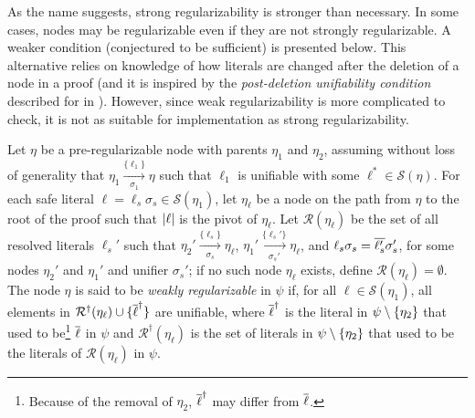 As the name suggests, strong regularizability is stronger than necessary. In some cases, nodes may be regularizable even if they are not strongly regularizable. A weaker condition (conjectured to be sufficient) is presented below. This alternative relies on knowledge of how literals are changed after the deletion of a node in a proof (and it is inspired by the \emph{post-deletion unifiability condition} described for {\FOLowerUnits} in \cite{GFOLU}). However, since weak regularizability is more complicated to check, it is not as suitable for implementation as strong regularizability. 
\begin{definition}\label{def:postdelprop}
Let $\eta$ be a pre-regularizable node with parents $\eta_1$ and $\eta_2$, assuming without loss of generality that $\eta_1 \xrightarrow[\sigma_1]{\{\ell_1\} } \eta$ 
such that $\ell_1$ is unifiable with some $\ell^* \in \mathcal{S}(\eta)$.
For each safe literal $\ell = \ell_s\sigma_s \in \mathcal{S}(\eta_1)$, let $\eta_\ell$ be a node on the path from $\eta$ to the root of the proof such that $\lvert\ell\rvert$ is the pivot of $\eta_\ell$.
Let $\mathcal{R}(\eta_\ell)$ be the set of all resolved literals $\ell_s'$ such that $\eta_2' \xrightarrow[\sigma_s]{\{\ell_s\} } \eta_\ell$, $\eta_1' \xrightarrow[\sigma_s']{\{\ell_s'\} } \eta_\ell$, and $\ell_s\sigma_s=\overline{\ell_s'}\sigma_s'$, for some nodes $\eta_2'$ and $\eta_1'$ and unifier $\sigma_s'$; if no such node $\eta_\ell$ exists, define $\mathcal{R}(\eta_\ell)=\emptyset$.
The node $\eta$ is said to be \emph{weakly regularizable} in $\psi$ if, for all $\ell \in \mathcal{S}(\eta_1)$, all elements in $\mathcal{R}^{\dagger}(\eta_\ell) \cup \{ \overline{\ell}^\dagger \}$ are unifiable, where $\overline{\ell}^{\dagger}$ is the literal in $\psi \setminus \{\eta_2\}$ that used to be\footnote{Because of the removal of $\eta_2$, $\overline{\ell}^{\dagger}$ may differ from $\overline{\ell}$.} $\overline{\ell}$ in $\psi$ and $\mathcal{R}^{\dagger}(\eta_\ell)$ is the set of literals in $\psi \setminus \{\eta_2\}$ that used to be the literals of $\mathcal{R}(\eta_\ell)$ in $\psi$.
\end{definition}



